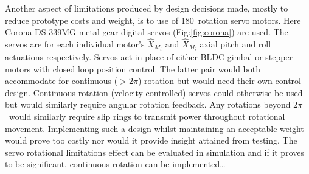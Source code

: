 \par
Another aspect of limitations produced by design decisions made, mostly to reduce prototype costs and weight, is to use of 180\textdegree ~rotation servo motors. Here Corona DS-339MG metal gear digital servos (Fig:\ref{fig:corona}) are used. The servos are for each individual motor's $\hat{X}_{M_i}$ and $\hat{X}_{M_i}$ axial pitch and roll actuations respectively. Servos act in place of either BLDC gimbal or stepper motors with closed loop position control. The latter pair would both accommodate for continuous  ($>2\pi$) rotation but would need their own control design. Continuous rotation (velocity controlled) servos could otherwise be used but would similarly require angular rotation feedback. Any rotations beyond 2$\pi$ ~would similarly require slip rings to transmit power throughout rotational movement. Implementing such a design whilst maintaining an acceptable weight would prove too costly nor would it provide insight attained from testing. The servo rotational limitations effect can be evaluated in simulation and if it proves to be significant, continuous rotation can be implemented\ldots
